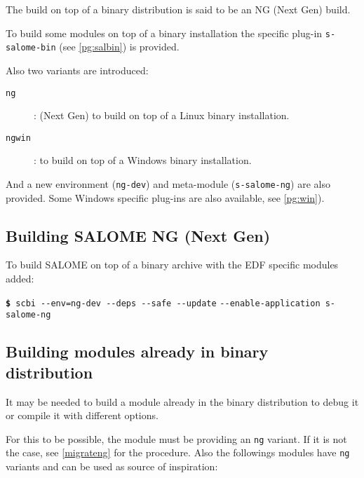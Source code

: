 \documentclass[a4paper,12pt,twoside]{article}
\newcommand{\code}[1]{\texttt{#1}}
\newcommand{\cmd}[1]{\tabto{1cm}\hspace{0.5cm}\texttt{\textbf{\$} #1}}
\newcommand{\cmdc}[1]{\tabto{1cm}\hspace{1.5cm}\texttt{#1}}
\newcommand{\ddash}{-{}-}
\begin{document}
The build on top of a binary distribution is said to be an NG (Next Gen) build.

To build some modules on top of a binary installation the specific plug-in \code{s-salome-bin} (see \ref{pg:salbin}) is provided.

Also two variants are introduced:

\begin{description}
	\item[\code{ng}] : (Next Gen) to build on top of a Linux binary installation.
	\item[\code{ngwin}] : to build on top of a Windows binary installation.
\end{description}

And a new environment (\code{ng-dev}) and meta-module (\code{s-salome-ng}) are also provided. Some Windows specific plug-ins are also available,  see \ref{pg:win}).

\subsection{Building SALOME NG (Next Gen)}

To build SALOME on top of a binary archive with the EDF specific modules added:

\cmd{scbi \ddash{}env=ng-dev \ddash{}deps \ddash{}safe \ddash{}update}
\cmdc{\ddash{}enable-application s-salome-ng}

\subsection{Building modules already in binary distribution}

It may be needed to build a module already in the binary distribution to debug it or compile it with different options.

For this to be possible, the module must be providing an \code{ng} variant. If it is not the case, see \ref{migrateng} for the procedure. Also the followings modules have \code{ng} variants and can be used as source of inspiration:
\end{document}
